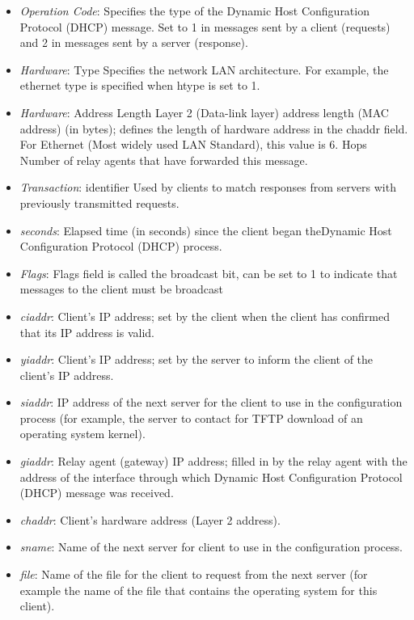 \documentclass[11pt]{article}
\begin{document}
\begin{itemize}
	\item \textit{Operation Code}:	Specifies the type of the Dynamic Host Configuration Protocol (DHCP) message. Set to 1 in messages sent by a client (requests) and 2 in messages sent by a server (response).
	\item \textit{Hardware}:  Type	Specifies the network LAN architecture. For example, the ethernet type is specified when htype is set to 1.
	\item \textit{Hardware}:  Address Length	Layer 2 (Data-link layer) address length (MAC address) (in bytes); defines the length of hardware address in the chaddr field. For Ethernet (Most widely used LAN Standard), this value is 6.
	Hops	Number of relay agents that have forwarded this message.
	\item \textit{Transaction}:  identifier	Used by clients to match responses from servers with previously transmitted requests.
	\item \textit{seconds}: 	Elapsed time (in seconds) since the client began theDynamic Host Configuration Protocol (DHCP) process.
	\item \textit{Flags}: 	Flags field is called the broadcast bit, can be set to 1 to indicate that messages to the client must be broadcast
	\item \textit{ciaddr}: 	Client's IP address; set by the client when the client has confirmed that its IP address is valid.
	\item \textit{yiaddr}: 	Client's IP address; set by the server to inform the client of the client's IP address.
	\item \textit{siaddr}: 	IP address of the next server for the client to use in the configuration process (for example, the server to contact for TFTP download of an operating system kernel).
	\item \textit{giaddr}: 	Relay agent (gateway) IP address; filled in by the relay agent with the address of the interface through which Dynamic Host Configuration Protocol (DHCP) message was received.
	\item \textit{chaddr}: 	Client's hardware address (Layer 2 address).
	\item \textit{sname}: 	Name of the next server for client to use in the configuration process.
	\item \textit{file}: 	Name of the file for the client to request from the next server (for example the name of the file that contains the operating system for this client).
\end{itemize}
\end{document}
